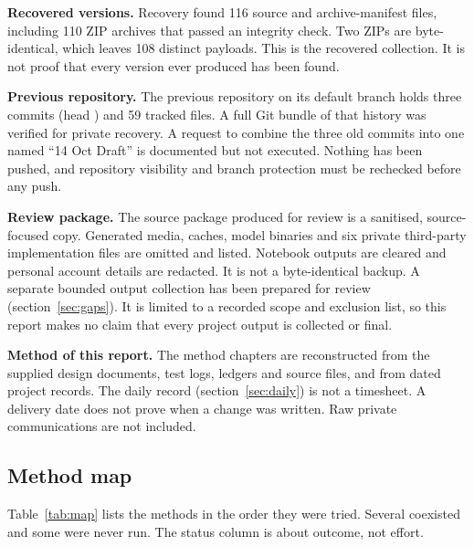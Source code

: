 \documentclass[11pt,a4paper]{article}
\newcommand{\code}[1]{\texttt{\detokenize{#1}}}
\begin{document}
\textbf{Recovered versions.} Recovery found 116 source and archive-manifest files, including 110 ZIP archives that passed an integrity check. Two ZIPs are byte-identical, which leaves 108 distinct payloads. This is the recovered collection. It is not proof that every version ever produced has been found.

\textbf{Previous repository.} The previous repository on its default branch holds three commits (head \code{73ee0b5}) and 59 tracked files. A full Git bundle of that history was verified for private recovery. A request to combine the three old commits into one named ``14 Oct Draft'' is documented but not executed. Nothing has been pushed, and repository visibility and branch protection must be rechecked before any push.

\textbf{Review package.} The source package produced for review is a sanitised, source-focused copy. Generated media, caches, model binaries and six private third-party implementation files are omitted and listed. Notebook outputs are cleared and personal account details are redacted. It is not a byte-identical backup. A separate bounded output collection has been prepared for review (section~\ref{sec:gaps}). It is limited to a recorded scope and exclusion list, so this report makes no claim that every project output is collected or final.

\textbf{Method of this report.} The method chapters are reconstructed from the supplied design documents, test logs, ledgers and source files, and from dated project records. The daily record (section~\ref{sec:daily}) is not a timesheet. A delivery date does not prove when a change was written. Raw private communications are not included.

\subsection{Method map}
Table~\ref{tab:map} lists the methods in the order they were tried. Several coexisted and some were never run. The status column is about outcome, not effort.
\end{document}
